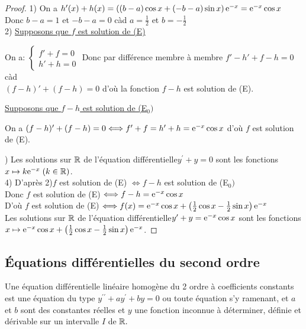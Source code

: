 \begin{proof}
  1)\; On a $ h^{\prime}(x)+h(x)=\left((b-a)\cos x+(-b-a)\sin x\right)\mathrm{e}^{-x} =\mathrm{e}^{-x}\cos x$ \\Donc $ b-a=1 $  et  $ -b-a=0 $ càd $a=\frac{1}{2} $ et $ b=-\frac{1}{2}$\\
  2)\; \underline{Supposons que $ f $  est solution de (E)}
  
  \medskip
  On a:\;  $  \begin{cases}  
f'+f=0 \\
h'+h=0
\end{cases} $ 
Donc par différence membre à membre \; $ f'-h'+f-h=0 $\; càd\\$ (f-h)'+(f-h)=0$\; d'où  la fonction $ f-h $  est solution de (E).

\medskip
\underline{Supposons que $ f-h $ est solution de  (E$_{0})$}

\medskip
On a \; $ (f-h)'+(f-h)=0   \Longleftrightarrow f'+f =h'+h=\mathrm{e}^{-x}\cos x$\; d'où  $ f $  est solution de (E).

)\; Les solutions sur $ \mathbb{R} $ de l'équation différentielle\;$ y^{\prime}+y=0 $\; sont les fonctions \; $ x\mapsto k\mathrm{e}^{-x}\; (k\in\mathbb{R}) $.\\
4)\; D'après  2)\;$ f $ est solution de (E) $ \Longleftrightarrow f-h $  est solution de (E$_{0})$\\
Donc $ f $ est solution de (E) $ \Longleftrightarrow f-h =\mathrm{e}^{-x}\cos x$  \\
D'où $ f $ est solution de (E) $ \Longleftrightarrow f(x) =\mathrm{e}^{-x}\cos x  +\left(\frac{1}{2}\cos x-\frac{1}{2}\sin x\right)\mathrm{e}^{-x} $  \\
Les solutions sur $ \mathbb{R} $ de l'équation différentielle\;$ y^{\prime}+y= \mathrm{e}^{-x}\cos x$\; sont les fonctions \\ $ x\mapsto \mathrm{e}^{-x}\cos x  +\left(\frac{1}{2}\cos x-\frac{1}{2}\sin x\right)\mathrm{e}^{-x} $.
\end{proof}

\subsection{Équations différentielles du second ordre}
\begin{definition}
Une équation différentielle linéaire homogène du 2 ordre  à coefficients constants  est une équation du type  $y^{\prime \prime} +ay^{\prime}+by= 0$\; ou toute équation s'y ramenant, et $a $ et $ b$ sont des constantes réelles et $ y $ une fonction inconnue à déterminer, définie et dérivable sur un intervalle $ I$ de  $ \mathbb{R}.$
\end{definition}


